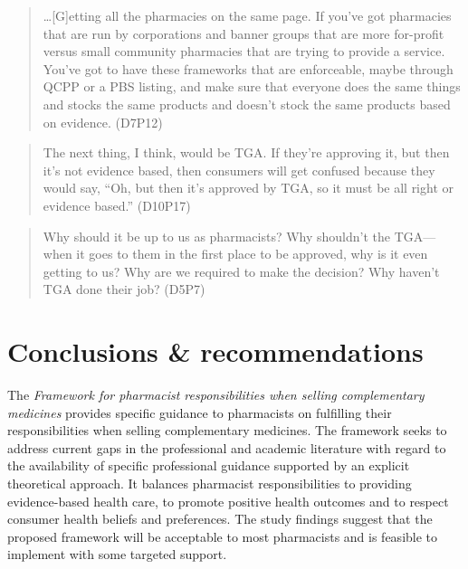 \documentclass[11pt,a4paper]{article}
\begin{document}
\begin{quote}
\ldots{}{[}G{]}etting all the pharmacies on the same page. If you've got
pharmacies that are run by corporations and banner groups that are more
for-profit versus small community pharmacies that are trying to provide
a service. You've got to have these frameworks that are enforceable,
maybe through QCPP or a PBS listing, and make sure that everyone does
the same things and stocks the same products and doesn't stock the same
products based on evidence. (D7P12)
\end{quote}

\begin{quote}
The next thing, I think, would be TGA. If they're approving it, but then
it's not evidence based, then consumers will get confused because they
would say, ``Oh, but then it's approved by TGA, so it must be all right
or evidence based.'' (D10P17)
\end{quote}

\begin{quote}
Why should it be up to us as pharmacists? Why shouldn't the TGA---when
it goes to them in the first place to be approved, why is it even
getting to us? Why are we required to make the decision? Why haven't TGA
done their job? (D5P7)
\end{quote}

\section{Conclusions \&
recommendations}\label{conclusions-recommendations}

The \emph{Framework for pharmacist responsibilities when selling
complementary medicines} provides specific guidance to pharmacists on
fulfilling their responsibilities when selling complementary medicines.
The framework seeks to address current gaps in the professional and
academic literature with regard to the availability of specific
professional guidance supported by an explicit theoretical approach. It
balances pharmacist responsibilities to providing evidence-based health
care, to promote positive health outcomes and to respect consumer health
beliefs and preferences. The study findings suggest that the proposed
framework will be acceptable to most pharmacists and is feasible to
implement with some targeted support.
\end{document}
